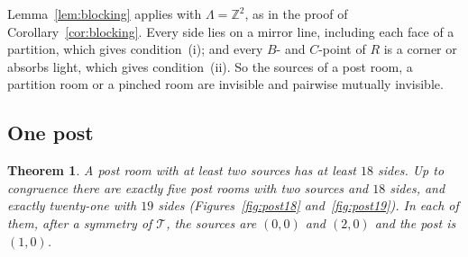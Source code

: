 \documentclass[11pt,a4paper]{article}
\theoremstyle{plain}
\newtheorem{theorem}{Theorem}[section]
\theoremstyle{definition}
\theoremstyle{remark}
\newcommand{\Z}{\mathbb{Z}}
\newcommand{\T}{\mathcal{T}}
\numberwithin{equation}{section}
\begin{document}
Lemma~\ref{lem:blocking} applies with $\Lambda=\Z^2$, as in the proof of Corollary~\ref{cor:blocking}. Every side lies on a mirror line, including each face of a partition, which gives condition~(i); and every $B$- and $C$-point of $R$ is a corner or absorbs light, which gives condition~(ii). So the sources of a post room, a partition room or a pinched room are invisible and pairwise mutually invisible.

\subsection{One post}
\begin{theorem}\label{thm:post}
A post room with at least two sources has at least $18$ sides. Up to congruence there are exactly five post rooms with two sources and $18$ sides, and exactly twenty-one with $19$ sides \textup{(}Figures~\textup{\ref{fig:post18}} and~\textup{\ref{fig:post19}}\textup{)}. In each of them, after a symmetry of $\T$, the sources are $(0,0)$ and $(2,0)$ and the post is $(1,0)$.
\end{theorem}
\end{document}
